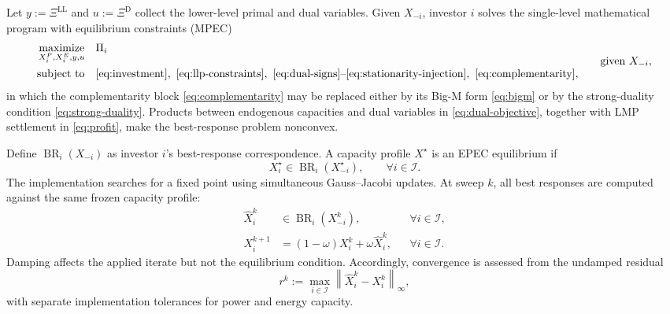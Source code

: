 \documentclass[11pt,a4paper,fleqn]{article}
\numberwithin{equation}{section}
\begin{document}
Let $y:=\Xi^{\mathrm{LL}}$ and $u:=\Xi^{\mathrm{D}}$ collect the lower-level
primal and dual variables. Given $X_{-i}$, investor $i$ solves the
single-level mathematical program with equilibrium constraints (MPEC)
\begin{equation}\label{eq:best-response}
\begin{aligned}
\underset{X_i^P,X_i^E,y,u}{\operatorname{maximize}}
\quad & \Pi_i\\
\text{subject to}\quad
&\eqref{eq:investment},\
\eqref{eq:llp-constraints},\
\eqref{eq:dual-signs}\text{--}\eqref{eq:stationarity-injection},\
\eqref{eq:complementarity},
\end{aligned}
\qquad \text{given }X_{-i},
\end{equation}
in which the complementarity block \eqref{eq:complementarity} may be replaced
either by its Big-M form \eqref{eq:bigm} or by the strong-duality condition
\eqref{eq:strong-duality}. Products between endogenous capacities and dual
variables in \eqref{eq:dual-objective}, together with LMP settlement in
\eqref{eq:profit}, make the best-response problem nonconvex.

Define $\operatorname{BR}_i(X_{-i})$ as investor $i$'s best-response
correspondence. A capacity profile $X^\star$ is an EPEC equilibrium if
\begin{equation}\label{eq:epec}
X_i^\star\in\operatorname{BR}_i(X_{-i}^\star),
\qquad \forall i\in\mathcal I.
\end{equation}
The implementation searches for a fixed point using simultaneous
Gauss--Jacobi updates. At sweep $k$, all best responses are computed against
the same frozen capacity profile:
\begin{subequations}\label{eq:jacobi}
\begin{align}
\widehat X_i^k
&\in\operatorname{BR}_i(X_{-i}^k),
&& \forall i\in\mathcal I,
\label{eq:raw-best-response}\\
X_i^{k+1}
&=(1-\omega)X_i^k+\omega\widehat X_i^k,
&& \forall i\in\mathcal I.
\label{eq:damped-update}
\end{align}
\end{subequations}
Damping affects the applied iterate but not the equilibrium condition.
Accordingly, convergence is assessed from the undamped residual
\begin{equation}\label{eq:raw-residual}
r^k
:=\max_{i\in\mathcal I}
\left\lVert\widehat X_i^k-X_i^k\right\rVert_\infty,
\end{equation}
with separate implementation tolerances for power and energy capacity.
\end{document}
